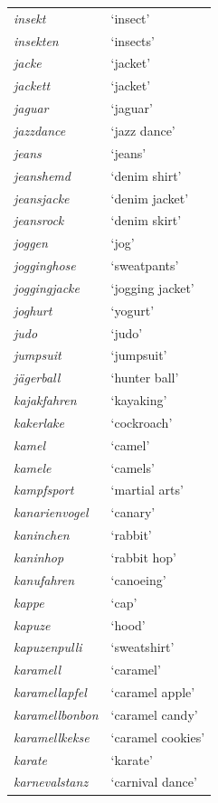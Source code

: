 \begin{longtable}{ll}
\textit{insekt} & `insect' \\
\textit{insekten} & `insects' \\
\textit{jacke} & `jacket' \\
\textit{jackett} & `jacket' \\
\textit{jaguar} & `jaguar' \\
\textit{jazzdance} & `jazz dance' \\
\textit{jeans} & `jeans' \\
\textit{jeanshemd} & `denim shirt' \\
\textit{jeansjacke} & `denim jacket' \\
\textit{jeansrock} & `denim skirt' \\
\textit{joggen} & `jog' \\
\textit{jogginghose} & `sweatpants' \\
\textit{joggingjacke} & `jogging jacket' \\
\textit{joghurt} & `yogurt' \\
\textit{judo} & `judo' \\
\textit{jumpsuit} & `jumpsuit' \\
\textit{jägerball} & `hunter ball' \\
\textit{kajakfahren} & `kayaking' \\
\textit{kakerlake} & `cockroach' \\
\textit{kamel} & `camel' \\
\textit{kamele} & `camels' \\
\textit{kampfsport} & `martial arts' \\
\textit{kanarienvogel} & `canary' \\
\textit{kaninchen} & `rabbit' \\
\textit{kaninhop} & `rabbit hop' \\
\textit{kanufahren} & `canoeing' \\
\textit{kappe} & `cap' \\
\textit{kapuze} & `hood' \\
\textit{kapuzenpulli} & `sweatshirt' \\
\textit{karamell} & `caramel' \\
\textit{karamellapfel} & `caramel apple' \\
\textit{karamellbonbon} & `caramel candy' \\
\textit{karamellkekse} & `caramel cookies' \\
\textit{karate} & `karate' \\
\textit{karnevalstanz} & `carnival dance' \\

\end{longtable}
